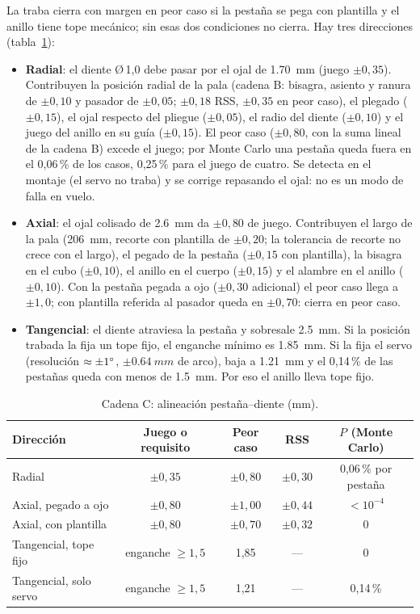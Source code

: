La traba cierra con margen en peor caso si la pestaña se pega con plantilla y el anillo
tiene tope mecánico; sin esas dos condiciones no cierra. Hay tres direcciones
(tabla~\ref{tab:fabricacion-cadenaC}):
\begin{itemize}
  \item \textbf{Radial}: el diente Ø\,1,0 debe pasar por el ojal de \SI{1.70}{mm} (juego
        $\pm0{,}35$). Contribuyen la posición radial de la pala (cadena B: bisagra, asiento y ranura de
        $\pm0{,}10$ y pasador de $\pm0{,}05$; $\pm0{,}18$ RSS, $\pm0{,}35$ en peor caso), el plegado ($\pm0{,}15$), el ojal respecto del pliegue ($\pm0{,}05$), el
        radio del diente ($\pm0{,}10$) y el juego del anillo en su guía ($\pm0{,}15$). El
        peor caso ($\pm0{,}80$, con la suma lineal de la cadena B) excede el juego; por Monte Carlo una pestaña queda fuera en
        el 0,06\,\% de los casos, 0,25\,\% para el juego de cuatro. Se detecta en el
        montaje (el servo no traba) y se corrige repasando el ojal: no es un modo de falla
        en vuelo.
  \item \textbf{Axial}: el ojal colisado de \SI{2.6}{mm} da $\pm0{,}80$ de juego. Contribuyen el largo de
        la pala (\SI{206}{mm}, recorte con plantilla de $\pm0{,}20$; la tolerancia de recorte no crece con el
        largo), el pegado de la pestaña ($\pm0{,}15$ con plantilla), la bisagra en el cubo ($\pm0{,}10$), el
        anillo en el cuerpo ($\pm0{,}15$) y el alambre en el anillo ($\pm0{,}10$). Con la
        pestaña pegada a ojo ($\pm0{,}30$ adicional) el peor caso llega a $\pm1{,}0$;
        con plantilla referida al pasador queda en $\pm0{,}70$: cierra en peor caso.
  \item \textbf{Tangencial}: el diente atraviesa la pestaña y sobresale \SI{2.5}{mm}. Si la
        posición trabada la fija un tope fijo, el enganche mínimo es \SI{1.85}{mm}. Si la
        fija el servo (resolución $\approx\ang{\pm1}$, $\pm\SI{0.64}{mm}$ de arco), baja
        a \SI{1.21}{mm} y el 0,14\,\% de las pestañas queda con menos de \SI{1.5}{mm}.
        Por eso el anillo lleva tope fijo.
\end{itemize}

\begin{table}[H]
\centering\small
\caption{Cadena C: alineación pestaña--diente (mm).}
\label{tab:fabricacion-cadenaC}
\begin{tabular}{@{}lcccc@{}}
\toprule
\textbf{Dirección} & \textbf{Juego o requisito} & \textbf{Peor caso} & \textbf{RSS} & \textbf{$P$ (Monte Carlo)}\\\midrule
Radial & $\pm0{,}35$ & $\pm0{,}80$ & $\pm0{,}30$ & 0,06\,\% por pestaña\\
Axial, pegado a ojo & $\pm0{,}80$ & $\pm1{,}00$ & $\pm0{,}44$ & $<10^{-4}$\\
Axial, con plantilla & $\pm0{,}80$ & $\pm0{,}70$ & $\pm0{,}32$ & 0\\
Tangencial, tope fijo & enganche $\ge1{,}5$ & 1,85 & --- & 0\\
Tangencial, solo servo & enganche $\ge1{,}5$ & 1,21 & --- & 0,14\,\%\\
\bottomrule
\end{tabular}
\end{table}

